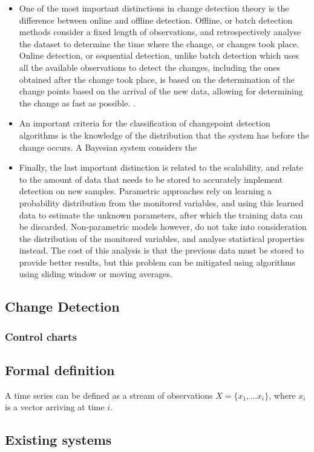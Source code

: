 \begin {itemize}
    \item One of the most important distinctions in change detection theory is the difference between online and offline detection. Offline, or batch detection methods consider a fixed length of observations, and retrospectively 
analyse the dataset to determine the time where the change, or changes took place. Online detection, or sequential detection, unlike batch detection which uses all the available observations to detect the changes, including the
ones obtained after the change took place, is based on the determination of the change points based on the arrival of the new data, allowing for determining the change as fast as possible.
\cite { CITE - http://citeseerx.ist.psu.edu/viewdoc/download?doi=10.1.1.425.1477&rep=rep1&type=pdf}. 
    \item An important criteria for the classification of changepoint detection algorithms is the knowledge of the distribution that the system has before the change occurs. A Bayesian system considers the 
    \item Finally, the last important distinction is related to the scalability, and relate to the amount of data that needs to be stored to accurately implement detection on new samples. Parametric approaches rely on learning a 
probability distribution from the monitored variables, and using this learned data to estimate the unknown parameters, after which the training data can be discarded. Non-parametric models however, do not take into consideration the
distribution of the monitored variables, and analyse statistical properties instead. The cost of this analysis is that the previous data must be stored to provide better results, but this problem can be mitigated using 
algorithms using sliding window or moving averages.
\end {itemize}

\subsection {Change Detection}
\subsubsection {Control charts}
\subsection {Formal definition}

A time series can be defined as a stream of observations $X = \{x_1, ... x_i\}$, where $x_i$ is a vector arriving at time $i$.
\subsection {Existing systems}
